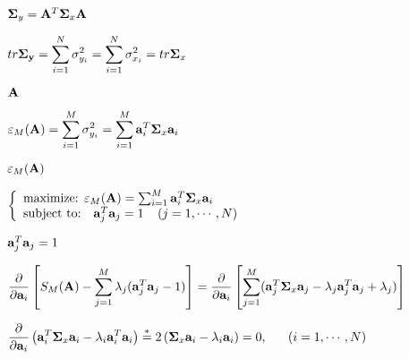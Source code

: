 \documentclass{article}
\def\lthtmlcheckvsize{\ifdim\ht\sizebox<\vsize 
  \ifdim\wd\sizebox<\hsize\expandafter\hfill\fi \expandafter\vfill
  \else\expandafter\vss\fi}%
\begin{document}
{\newpage\clearpage
{}%
$ {\bf\Sigma}_y={\bf A}^T{\bf\Sigma}_x{\bf A}$%
\lthtmlindisplaymathZ
\lthtmlcheckvsize\clearpage}

{\newpage\clearpage
{}%
$\displaystyle tr {\bf\Sigma_y}=\sum_{i=1}^N\sigma_{y_i}^2=\sum_{i=1}^N\sigma_{x_i}^2
=tr {\bf\Sigma}_x$%
\lthtmlindisplaymathZ
\lthtmlcheckvsize\clearpage}

{\newpage\clearpage
{}%
$ {\bf A}$%
\lthtmlindisplaymathZ
\lthtmlcheckvsize\clearpage}

{\newpage\clearpage
{}%
$\displaystyle \varepsilon_M({\bf A})=\sum_{i=1}^M\sigma_{y_i}^2
=\sum_{i=1}^M{\bf a}_i^T{\bf\Sigma}_x{\bf a}_i$%
\lthtmlindisplaymathZ
\lthtmlcheckvsize\clearpage}

{\newpage\clearpage
{}%
$ \varepsilon_M({\bf A})$%
\lthtmlindisplaymathZ
\lthtmlcheckvsize\clearpage}

{\newpage\clearpage
{}%
$\displaystyle \left\{	\begin{array}{l}
\mbox{maximize:  } \varepsilon_M({\bf A})
=\sum_{i=1}^M{\bf a}_i^T{\bf\Sigma}_x{\bf a}_i  \\
\mbox{subject to:  }\;\; {\bf a}_j^{T}{\bf a}_j=1 \;\;\;\;(j=1,\cdots,N)
\end{array} \right.$%
\lthtmlindisplaymathZ
\lthtmlcheckvsize\clearpage}

{\newpage\clearpage
{}%
$ {\bf a}_j^{T}{\bf a}_j=1$%
\lthtmlindisplaymathZ
\lthtmlcheckvsize\clearpage}

{\newpage\clearpage
{}%
$\displaystyle \frac{\partial}{\partial {\bf a}_i}\left[S_M({\bf A})-\sum_{j=1}^{M}
\lambda_j({\bf a}_j^{T}{\bf a}_j-1)\right]
=\frac{\partial}{\partial {\bf a}_i}\left[\sum_{j=1}^{M}
({\bf a}_j^{T}{\bf\Sigma}_x{\bf a}_j-\lambda_j {\bf a}_j^{T}{\bf a}_j+\lambda_j) \right]$%
\lthtmlindisplaymathZ
\lthtmlcheckvsize\clearpage}

{\newpage\clearpage
{}%
$\displaystyle \frac{\partial}{\partial {\bf a}_i}
\left({\bf a}_i^{T}{\bf\Sigma}_x{\bf a}_i-\lambda_i{\bf a}_i^{T}{\bf a}_i\right)
\stackrel{*}{=} 2\left({\bf\Sigma}_x{\bf a}_i-\lambda_i{\bf a}_i\right)
=0, \;\;\;\;\;\;(i=1, \cdots, N)$%
\lthtmlindisplaymathZ
\lthtmlcheckvsize\clearpage}
\end{document}
